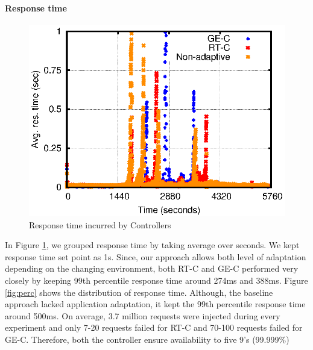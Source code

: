 \paragraph*{\textbf{Response time}}
\begin{figure} [htb]
\centering
\includegraphics[scale=.8]{Graphs/responseTime.eps}
\caption{Response time incurred by Controllers}
\label{fig:rt}
\end{figure}
In Figure \ref{fig:rt}, we grouped response time by taking average over seconds. We kept response time set point as 1s. Since, our approach allows both level of adaptation depending on the changing environment, both RT-C and GE-C performed very closely by keeping 99th percentile response time around 274ms and 388ms. Figure \ref{fig:perc} shows the distribution of response time. Although, the baseline approach lacked application adaptation, it kept the 99th percentile response time around 500ms. On average, 3.7 million requests were injected during every experiment and only 7-20 requests failed for RT-C and 70-100 requests failed for GE-C. Therefore, both the controller ensure availability to five 9's (99.999\%)


